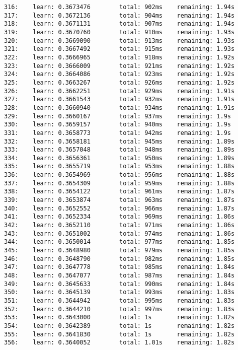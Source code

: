 \documentclass[11pt]{article}
\begin{document}
\begin{Verbatim}[commandchars=\\\{\}]
316:    learn: 0.3673476        total: 902ms    remaining: 1.94s
317:    learn: 0.3672136        total: 904ms    remaining: 1.94s
318:    learn: 0.3671131        total: 907ms    remaining: 1.94s
319:    learn: 0.3670760        total: 910ms    remaining: 1.93s
320:    learn: 0.3669090        total: 913ms    remaining: 1.93s
321:    learn: 0.3667492        total: 915ms    remaining: 1.93s
322:    learn: 0.3666965        total: 918ms    remaining: 1.92s
323:    learn: 0.3666009        total: 921ms    remaining: 1.92s
324:    learn: 0.3664086        total: 923ms    remaining: 1.92s
325:    learn: 0.3663267        total: 926ms    remaining: 1.92s
326:    learn: 0.3662251        total: 929ms    remaining: 1.91s
327:    learn: 0.3661543        total: 932ms    remaining: 1.91s
328:    learn: 0.3660940        total: 934ms    remaining: 1.91s
329:    learn: 0.3660167        total: 937ms    remaining: 1.9s
330:    learn: 0.3659157        total: 940ms    remaining: 1.9s
331:    learn: 0.3658773        total: 942ms    remaining: 1.9s
332:    learn: 0.3658181        total: 945ms    remaining: 1.89s
333:    learn: 0.3657048        total: 948ms    remaining: 1.89s
334:    learn: 0.3656361        total: 950ms    remaining: 1.89s
335:    learn: 0.3655719        total: 953ms    remaining: 1.88s
336:    learn: 0.3654969        total: 956ms    remaining: 1.88s
337:    learn: 0.3654309        total: 959ms    remaining: 1.88s
338:    learn: 0.3654122        total: 961ms    remaining: 1.87s
339:    learn: 0.3653874        total: 963ms    remaining: 1.87s
340:    learn: 0.3652552        total: 966ms    remaining: 1.87s
341:    learn: 0.3652334        total: 969ms    remaining: 1.86s
342:    learn: 0.3652110        total: 971ms    remaining: 1.86s
343:    learn: 0.3651002        total: 974ms    remaining: 1.86s
344:    learn: 0.3650014        total: 977ms    remaining: 1.85s
345:    learn: 0.3648980        total: 979ms    remaining: 1.85s
346:    learn: 0.3648790        total: 982ms    remaining: 1.85s
347:    learn: 0.3647778        total: 985ms    remaining: 1.84s
348:    learn: 0.3647077        total: 987ms    remaining: 1.84s
349:    learn: 0.3645633        total: 990ms    remaining: 1.84s
350:    learn: 0.3645139        total: 993ms    remaining: 1.83s
351:    learn: 0.3644942        total: 995ms    remaining: 1.83s
352:    learn: 0.3644210        total: 997ms    remaining: 1.83s
353:    learn: 0.3643000        total: 1s       remaining: 1.82s
354:    learn: 0.3642389        total: 1s       remaining: 1.82s
355:    learn: 0.3641830        total: 1s       remaining: 1.82s
356:    learn: 0.3640052        total: 1.01s    remaining: 1.82s

\end{Verbatim}
\end{document}
